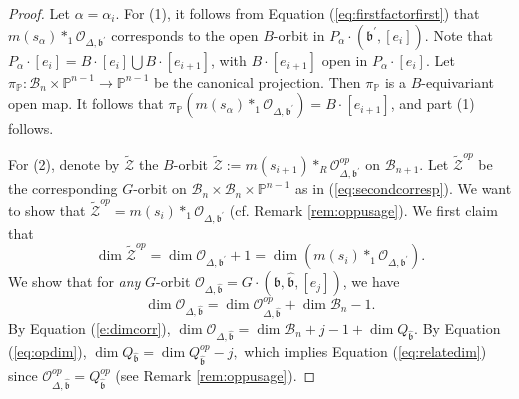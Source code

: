 \documentclass[12pt]{amsart}
\numberwithin{equation}{section}
\newcommand{\cZ}{{\mathcal Z}}
\newcommand{\fb}{\mbox{${\mathfrak b}$}}
\newcommand{\B}{\mathcal{B}}
\newcommand{\ms}{m(s_{\alpha})}
\begin{document}
\begin{proof}
Let $\alpha = \alpha_i.$  For (1), it follows from Equation (\ref{eq:firstfactorfirst}) that $\ms*_{1}\mathcal{O}_{\Delta,\fb^{\prime}}$ corresponds to the open $B$-orbit in $P_{\alpha}\cdot(\fb^{\prime}, [e_{i}])$.  Note that 
$P_{\alpha}\cdot [e_{i}]=B\cdot [e_{i}]\bigcup B\cdot [e_{i+1}]$, with $B\cdot [e_{i+1}]$ open in $P_{\alpha}\cdot[e_{i}].$   Let $\pi_{\mathbb{P}}:\B_{n}\times \mathbb{P}^{n-1}\to \mathbb{P}^{n-1}$ be the canonical projection.   Then $\pi_{\mathbb{P}}$ is a $B$-equivariant open map.  It follows that $\pi_{\mathbb{P}}(\ms*_{1}\mathcal{O}_{\Delta,\fb^{\prime}})=B\cdot[e_{i+1}]$, and part (1) follows.  

For (2), denote by $\tilde{\cZ}$ the $B$-orbit $ \tilde{\cZ}:=m(s_{i+1})*_{R}\mathcal{O}_{\Delta,\fb^{\prime}}^{op}$ on $\B_{n+1}.$ 
 Let $\tilde{\cZ}^{op}$ be the corresponding $G$-orbit on $\B_{n}\times \B_{n}\times \mathbb{P}^{n-1}$ as in (\ref{eq:secondcorresp}).  We want to show that  $\tilde{\cZ}^{op}=m(s_{i})*_{1} \mathcal{O}_{\Delta,\fb^{\prime}}$ (cf. Remark \ref{rem:oppusage}).  We first claim that  
\begin{equation}\label{eq:dimby1}
\dim \tilde{\cZ}^{op}=\dim\mathcal{O}_{\Delta,\fb^{\prime}}+1=\dim\left( m(s_{i})*_{1} \mathcal{O}_{\Delta,\fb^{\prime}} \right).
\end{equation}
We show that for \emph{any} $G$-orbit $\mathcal{O}_{\Delta,\hat{\fb}}=G\cdot(\fb,\hat{\fb}, [e_{j}])$, we have 
\begin{equation}\label{eq:relatedim}
\dim \mathcal{O}_{\Delta,\hat{\fb}}=\dim \mathcal{O}_{\Delta,\hat{\fb}}^{op}+\dim\B_{n}-1.
\end{equation}
 By Equation (\ref{e:dimcorr}), $\dim \mathcal{O}_{\Delta,\hat{\fb}}=\dim \B_{n}+j-1+\dim Q_{\hat{\fb}}.$  By Equation (\ref{eq:opdim}), $\dim Q_{\hat{\fb}} = \dim Q_{\hat{\fb}}^{op}-j,$ which implies Equation (\ref{eq:relatedim}) since $\mathcal{O}_{\Delta,\hat{\fb}}^{op}=Q_{\hat{\fb}}^{op}$ (see Remark \ref{rem:oppusage}).

\end{proof}
\end{document}
